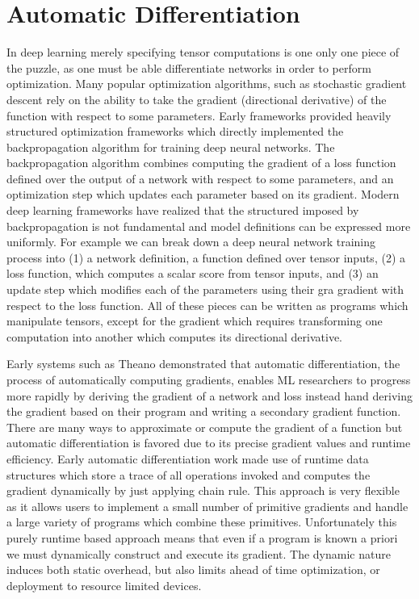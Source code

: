\chapter{Automatic Differentiation}
\label{ch:ad}

In deep learning merely specifying tensor computations is
  one only one piece of the puzzle, as one must be able
  differentiate networks in order to perform optimization.
Many popular optimization algorithms,
  such as stochastic gradient descent
  rely on the ability to take
  the gradient (directional derivative) of the function with
  respect to some parameters.
Early frameworks provided heavily structured optimization frameworks
  which directly implemented the backpropagation algorithm for training
  deep neural networks.
The backpropagation algorithm combines
  computing the gradient of a loss function defined over the
  output of a network with respect to some parameters, and an
  optimization step which updates each parameter based on its
  gradient.
Modern deep learning frameworks have realized that the
  structured imposed by backpropagation is not fundamental
  and model definitions can be expressed more uniformly.
For example we can break down a deep neural network training
  process into (1) a network definition, a function defined over tensor inputs,
  (2) a loss function, which computes a scalar score from tensor
  inputs, and (3) an update step which modifies each of the parameters using their gra
  gradient with respect to the loss function.
All of these pieces can be written as programs which manipulate tensors,
  except for the gradient which requires transforming
  one computation into another which computes its directional derivative.

Early systems such as Theano demonstrated that automatic
  differentiation, the process of automatically computing gradients,
  enables ML researchers to progress more rapidly
  by deriving the gradient of a network and loss instead hand deriving
  the gradient based on their program and writing a secondary gradient function.
There are many ways to approximate or compute the gradient of a function
  but automatic differentiation is favored due to its precise gradient
  values and runtime efficiency.
Early automatic differentiation work made use of runtime data structures
  which store a trace of all operations invoked and computes the gradient
  dynamically by just applying chain rule.
This approach is very flexible as it allows users to implement a small number
  of primitive gradients and handle a large variety of programs which combine
  these primitives.
Unfortunately this purely runtime based approach means that even if a program
  is known a priori we must dynamically construct and execute its gradient.
The dynamic nature induces both static overhead, but also limits ahead of time
  optimization, or deployment to resource limited devices.

